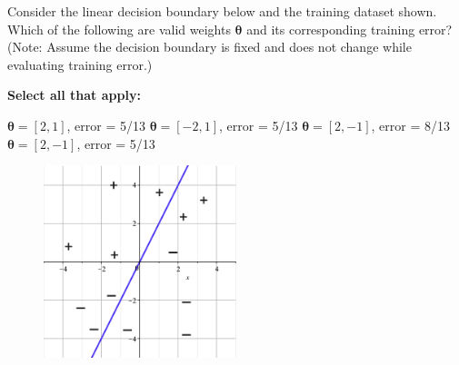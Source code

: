 \documentclass[11pt,addpoints,answers]{exam}
\numberwithin{equation}{section} %
\numberwithin{figure}{section} %
\numberwithin{table}{section} %
\begin{document}
\begin{questions}
    
    \question[2] Consider the linear decision boundary below and the training dataset shown. Which of the following are valid weights $\bm{\theta}$ and its corresponding training error? (Note: Assume the decision boundary is fixed and does not change while evaluating training error.)
    
    \textbf{Select all that apply:}
    {%
    \checkboxchar{$\Box$} \checkedchar{$\blacksquare$}
    \begin{checkboxes}
        \choice $\bm{\theta} = [2,1]$, error  = 5/13
        \choice $\bm{\theta} = [-2,1]$, error = 5/13
        \choice $\bm{\theta} = [2,-1]$, error = 8/13
        \choice $\bm{\theta} = [2,-1]$, error = 5/13
    \end{checkboxes}
    }
    
    
    \begin{figure}[H]
        \centering
        \includegraphics[width = 0.5\textwidth]{perceptron_boundary.png}
        \label{Q_10perceptron}
    \end{figure}
    

    \clearpage
\end{questions}
\end{document}
